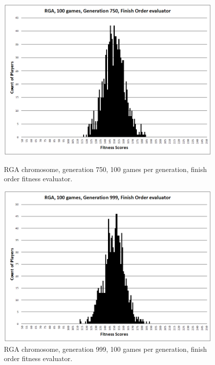 \begin{figure}
\begin{minipage}[t]{0.47\linewidth}
\centering
\includegraphics[width=1.0\linewidth]{Figures/RGA_1024_G750_N100_FO.png}
\caption[RGA Fitness Distribution, 750th Generation]{RGA chromosome, generation
750, 100 games per generation, finish order fitness evaluator.} \label{figure-RGA-750th_gen_fitness}
\end{minipage}%
\hspace{0.06\linewidth}%
\begin{minipage}[t]{0.47\linewidth}
\centering
\includegraphics[width=1.0\linewidth]{Figures/RGA_1024_G999_N100_FO.png}
\caption[RGA Fitness Distribution, 999th Generation]{RGA chromosome, generation
999, 100 games per generation, finish order fitness evaluator.} \label{figure-RGA-999th_gen_fitness}

\end{minipage}
\end{figure}

